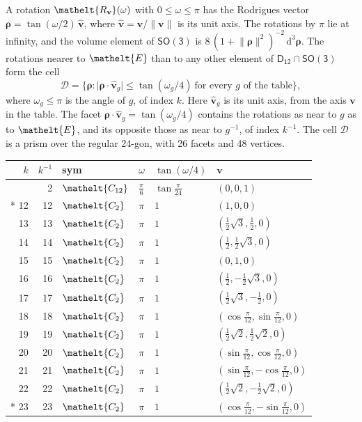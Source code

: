 \documentclass[10pt,a4paper]{article}
\numberwithin{equation}{section}
\newcommand{\eltfont}[1]{{\let\sigma\eltsigma\mathelt{#1}}}
\newcommand{\grp}[1]{\mathsf{#1}}
\newcommand{\cls}[1]{\eltfont{#1}}
\newcommand{\elt}[1]{\eltfont{#1}}
\newcommand{\dirvec}[3]{(#1, #2, #3)}
\newcommand{\unitaxis}{\hat{\mathbf{v}}}
\newcommand{\vv}{\mathbf{v}}
\newcommand{\diff}{\mathrm{d}}
\newcommand{\rodrigues}{\boldsymbol{\rho}}
\newcommand{\fcell}{\mathcal{D}}
\begin{document}
\leavevmode\label{n:vector.rodrigues}\label{n:vector.unitaxis}A rotation $\elt{R_{\vv}}(\omega)$ with $0 \le \omega \le \pi$ has the Rodrigues vector $\rodrigues = \tan(\omega/2)\,\unitaxis$, where $\unitaxis = \vv/\lVert\vv\rVert$ is its unit axis. The rotations by $\pi$ lie at infinity, and the volume element of \href{SO3.pdf}{$\grp{SO(3)}$} is $8\,(1 + \lVert\rodrigues\rVert^2)^{-2}\,\diff^3\rodrigues$.
\leavevmode\label{n:set.cell}The rotations nearer to $\elt{E}$ than to any other element of $\grp{D_{12}} \cap \grp{SO(3)}$ form the cell
\begin{equation}\label{e:cell}\fcell = \bigl\{\rodrigues : \lvert\rodrigues\cdot\unitaxis_g\rvert \le \tan(\omega_g/4)\ \text{for every $g$ of the table}\bigr\},\end{equation}
where $\omega_g \le \pi$ is the angle of $g$, of index $k$. Here $\unitaxis_g$ is its unit axis, from the axis $\vv$ in the table. The facet $\rodrigues\cdot\unitaxis_g = \tan(\omega_g/4)$ contains the rotations as near to $g$ as to $\elt{E}$, and its opposite those as near to $g^{-1}$, of index $k^{-1}$. The cell $\fcell$ is a prism over the regular 24-gon, with 26 facets and 48 vertices.
{\small{\renewcommand{\arraystretch}{1.3}\begin{longtable}{@{}rrllll@{}}\toprule
$k$ & $k^{-1}$ & sym & $\omega$ & $\tan(\omega/4)$ & $\vv$\\\midrule\endhead
\bottomrule\endfoot\endlastfoot
1 & 2 & $\cls{C_{12}}$ & $\tfrac{\pi}{6}$ & $\tan\tfrac{\pi}{24}$ & $\dirvec{0}{0}{1}$\\*
12 & 12 & $\cls{C_{2}}$ & $\pi$ & $1$ & $\dirvec{1}{0}{0}$\\
13 & 13 & $\cls{C_{2}}$ & $\pi$ & $1$ & $\dirvec{\tfrac{1}{2}\sqrt{3}}{\tfrac{1}{2}}{0}$\\
14 & 14 & $\cls{C_{2}}$ & $\pi$ & $1$ & $\dirvec{\tfrac{1}{2}}{\tfrac{1}{2}\sqrt{3}}{0}$\\
15 & 15 & $\cls{C_{2}}$ & $\pi$ & $1$ & $\dirvec{0}{1}{0}$\\
16 & 16 & $\cls{C_{2}}$ & $\pi$ & $1$ & $\dirvec{\tfrac{1}{2}}{-\tfrac{1}{2}\sqrt{3}}{0}$\\
17 & 17 & $\cls{C_{2}}$ & $\pi$ & $1$ & $\dirvec{\tfrac{1}{2}\sqrt{3}}{-\tfrac{1}{2}}{0}$\\
18 & 18 & $\cls{C_{2}}$ & $\pi$ & $1$ & $\dirvec{\cos\tfrac{\pi}{12}}{\sin\tfrac{\pi}{12}}{0}$\\
19 & 19 & $\cls{C_{2}}$ & $\pi$ & $1$ & $\dirvec{\tfrac{1}{2}\sqrt{2}}{\tfrac{1}{2}\sqrt{2}}{0}$\\
20 & 20 & $\cls{C_{2}}$ & $\pi$ & $1$ & $\dirvec{\sin\tfrac{\pi}{12}}{\cos\tfrac{\pi}{12}}{0}$\\
21 & 21 & $\cls{C_{2}}$ & $\pi$ & $1$ & $\dirvec{\sin\tfrac{\pi}{12}}{-\cos\tfrac{\pi}{12}}{0}$\\
22 & 22 & $\cls{C_{2}}$ & $\pi$ & $1$ & $\dirvec{\tfrac{1}{2}\sqrt{2}}{-\tfrac{1}{2}\sqrt{2}}{0}$\\*
23 & 23 & $\cls{C_{2}}$ & $\pi$ & $1$ & $\dirvec{\cos\tfrac{\pi}{12}}{-\sin\tfrac{\pi}{12}}{0}$\\
\bottomrule\end{longtable}}}
\end{document}
